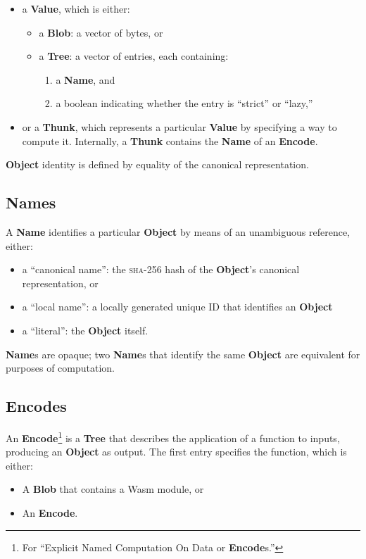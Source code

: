 \documentclass{article}
\newcommand{\blob}{\textbf{Blob}\xspace}
\newcommand{\valuex}{\textbf{Value}\xspace}
\newcommand{\object}{\textbf{Object}\xspace}
\newcommand{\encode}{\textbf{Encode}\xspace}
\newcommand{\thunk}{\textbf{Thunk}\xspace}
\newcommand{\encodes}{\textbf{Encode}s\xspace}
\newcommand{\name}{\textbf{Name}\xspace}
\newcommand{\names}{\textbf{Name}s\xspace}
\newcommand{\tree}{\textbf{Tree}\xspace}
\begin{document}
\begin{itemize}[itemsep=0pt]
\item a \valuex, which is either:
\begin{itemize}[itemsep=0pt]
  \item a \blob: a vector of bytes, or

  \item a \tree: a vector of entries, each containing:

    \begin{enumerate}[topsep=0pt, itemsep=0pt]
    \item a \name, and

    \item a boolean indicating whether the entry is ``strict'' or ``lazy,''
    \end{enumerate}
\end{itemize}

\item or a \thunk, which represents a particular \valuex by specifying
  a way to compute it. Internally, a \thunk contains the \name of an \encode.
\end{itemize}

\object identity is defined by equality of the canonical representation.

\subsection{\names}

A \name identifies a particular \object by means of an unambiguous
reference, either:
    \begin{itemize}[itemsep=0pt]
    \item a ``canonical name'': the \textsc{sha-256} hash of the \object's canonical representation, or
    \item a ``local name'': a locally generated unique ID that identifies an \object
    \item a ``literal'': the \object itself.
    \end{itemize}

\names are opaque; two \names that identify the same \object are equivalent for purposes of computation.

\subsection{\encodes}

An \encode\footnote{For ``Explicit Named Computation On Data or
\encodes.''} is a \tree that describes the application of a function
to inputs, producing an \object as output. The first entry specifies the
function, which is either:
\begin{itemize}[itemsep=0pt]
\item A \blob that contains a Wasm module, or
\item An \encode.
\end{itemize}
\end{document}
